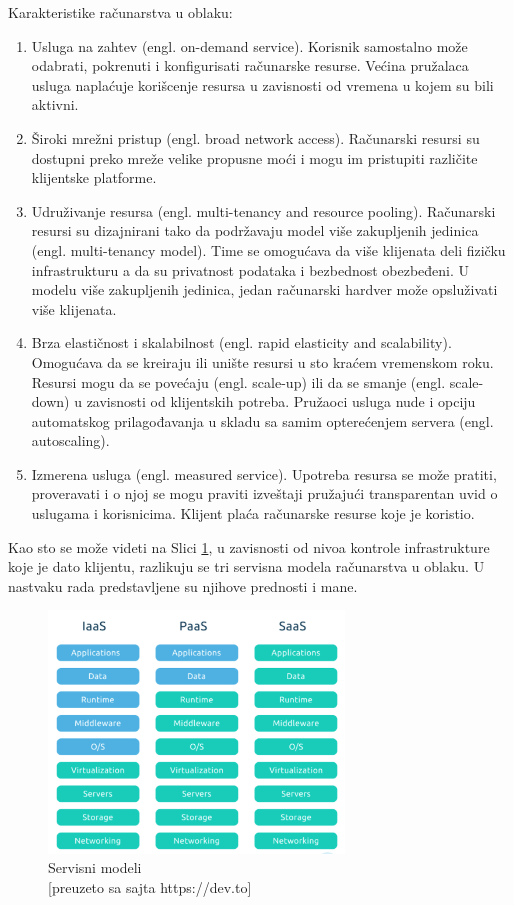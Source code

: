 \documentclass[12pt,oneside]{memoir}
\begin{document}
Karakteristike računarstva u oblaku:
\begin{enumerate}
  \item Usluga na zahtev (engl. on-demand service). Korisnik samostalno može odabrati, pokrenuti i konfigurisati računarske resurse. Većina pružalaca usluga naplaćuje korišcenje resursa u zavisnosti od vremena u kojem su bili aktivni.
  \item Široki mrežni pristup (engl. broad network access). Računarski resursi su dostupni preko mreže velike propusne moći i mogu im pristupiti različite klijentske platforme.
  \item Udruživanje resursa (engl. multi-tenancy and resource pooling). Računarski resursi su dizajnirani tako da podržavaju model više zakupljenih jedinica (engl. multi-tenancy model). Time se omogućava da više klijenata deli fizičku infrastrukturu a da su privatnost podataka i bezbednost obezbeđeni. U modelu više zakupljenih jedinica, jedan računarski hardver može opsluživati više klijenata.
  \item Brza elastičnost i skalabilnost (engl. rapid elasticity and scalability). Omogućava da se kreiraju ili unište resursi u sto kraćem vremenskom roku. Resursi mogu da se povećaju (engl. scale-up) ili da se smanje (engl. scale-down) u zavisnosti od klijentskih potreba. Pružaoci usluga nude i opciju automatskog prilagođavanja u skladu sa samim opterećenjem servera (engl. autoscaling).
  \item Izmerena usluga (engl. measured service). Upotreba resursa se može pratiti, proveravati i o njoj se mogu praviti izveštaji pružajući transparentan uvid o uslugama i korisnicima. Klijent plaća računarske resurse koje je koristio.
\end{enumerate}

Kao sto se može videti na Slici \ref{fig:servisniModeli}, u zavisnosti od nivoa kontrole infrastrukture koje je dato klijentu, razlikuju se tri servisna modela računarstva u oblaku. U nastvaku rada predstavljene su njihove prednosti i mane.

\begin{figure}[!ht]
  \centering
  \includegraphics[width=0.7\textwidth]{Slika 5.png}
  \caption{Servisni modeli\\\footnotesize[preuzeto sa sajta https://dev.to]}
  \label{fig:servisniModeli}
\end{figure}
 
\end{document}
